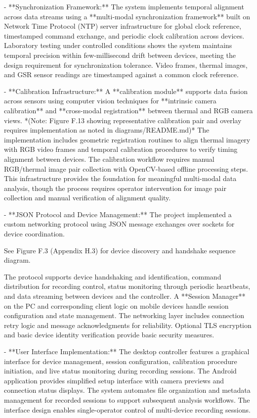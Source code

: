 \documentclass[12pt,a4paper]{article}
\begin{document}
{- **Synchronization Framework:** The system implements temporal alignment
  across data streams using a **multi-modal synchronization framework**
  built on Network Time Protocol (NTP) server infrastructure for global
  clock reference, timestamped command exchange, and periodic clock
  calibration across devices. Laboratory testing under controlled
  conditions shows the system maintains temporal precision within
  few-millisecond drift between devices, meeting the design requirement
  for synchronization tolerance. Video frames, thermal images, and GSR
  sensor readings are timestamped against a common clock reference.

- **Calibration Infrastructure:** A **calibration module** supports data
  fusion across sensors using computer vision techniques for **intrinsic
  camera calibration** and **cross-modal registration** between thermal
  and RGB camera views. *(Note: Figure F.13 showing representative calibration 
  pair and overlay requires implementation as noted in diagrams/README.md)* 
  The implementation includes
  geometric registration routines to align thermal imagery with RGB
  video frames and temporal calibration procedures to verify timing
  alignment between devices. The calibration workflow requires manual
  RGB/thermal image pair collection with OpenCV-based offline processing
  steps. This infrastructure provides the foundation for meaningful
  multi-modal data analysis, though the process requires operator
  intervention for image pair collection and manual verification of
  alignment quality.

- **JSON Protocol and Device Management:** The project implemented a
  custom networking protocol using JSON message exchanges over sockets
  for device coordination. 

See Figure F.3 (Appendix H.3) for device discovery and handshake sequence diagram.

  The protocol supports device handshaking and identification, command
  distribution for recording control, status monitoring through periodic
  heartbeats, and data streaming between devices and the controller.
  A **Session Manager** on the PC and corresponding client logic on
  mobile devices handle session configuration and state management.
  The networking layer includes connection retry logic and message
  acknowledgments for reliability. Optional TLS encryption and basic
  device identity verification provide basic security measures.

- **User Interface Implementation:** The desktop controller features a
  graphical interface for device management, session configuration,
  calibration procedure initiation, and live status monitoring during
  recording sessions. The Android application provides simplified setup
  interface with camera previews and connection status displays. The
  system automates file organization and metadata management for recorded
  sessions to support subsequent analysis workflows. The interface design
  enables single-operator control of multi-device recording sessions.

}
\end{document}
